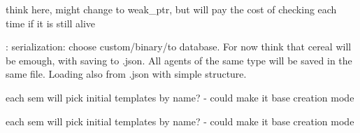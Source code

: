 \begin{DoxyRefList}
\item[\label{_dev_stage2__DevStage2000029}%
\hypertarget{_dev_stage2__DevStage2000029}{}%
Member \hyperlink{classsolar__core_1_1_w_a1d35d6501eef6d673bd2b28e2c1724c4}{solar\+\_\+core\+:\+:W\+:\+:interconnected\+\_\+projects} ]think here, might change to weak\+\_\+ptr, but will pay the cost of checking each time if it is still alive  
\item[\label{_dev_stage2__DevStage2000028}%
\hypertarget{_dev_stage2__DevStage2000028}{}%
Member \hyperlink{classsolar__core_1_1_w_a969ad4de57020878a91873868c9bdb45}{solar\+\_\+core\+:\+:W\+:\+:W} (std\+::string path\+\_\+, \hyperlink{classsolar__core_1_1_helper_w}{Helper\+W} $\ast$w\+\_\+, std\+::string mode\+\_\+=\char`\"{}\+N\+E\+W\char`\"{})]\+: serialization\+: choose custom/binary/to database. For now think that cereal will be emough, with saving to .json. All agents of the same type will be saved in the same file. Loading also from .json with simple structure.

each sem will pick initial templates by name? -\/ could make it base creation mode 

each sem will pick initial templates by name? -\/ could make it base creation mode 
\end{DoxyRefList}